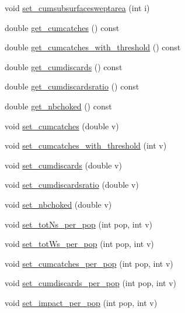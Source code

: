 \begin{DoxyCompactItemize}
void \mbox{\hyperlink{class_node_data_a6e42f6df786bb22c5ecf9ed6409ef620}{set\+\_\+cumsubsurfacesweptarea}} (int i)
\item 
double \mbox{\hyperlink{class_node_data_a72fdd0a26b6b8394848e85a35f3ffd6c}{get\+\_\+cumcatches}} () const
\item 
double \mbox{\hyperlink{class_node_data_af0c4f0aadd5269e87e146096aa319c9d}{get\+\_\+cumcatches\+\_\+with\+\_\+threshold}} () const
\item 
double \mbox{\hyperlink{class_node_data_a9c6feaee560aef467102f8be89b2be9f}{get\+\_\+cumdiscards}} () const
\item 
double \mbox{\hyperlink{class_node_data_ac2ad586d1abdeb855720eef7a53c9d7d}{get\+\_\+cumdiscardsratio}} () const
\item 
double \mbox{\hyperlink{class_node_data_abb730bf1ca3746720aee82026c412188}{get\+\_\+nbchoked}} () const
\item 
void \mbox{\hyperlink{class_node_data_a66410e73ac03ea7d1dacfe0bdc99a219}{set\+\_\+cumcatches}} (double v)
\item 
void \mbox{\hyperlink{class_node_data_a37af34b399035d586105099d768136cf}{set\+\_\+cumcatches\+\_\+with\+\_\+threshold}} (int v)
\item 
void \mbox{\hyperlink{class_node_data_afa19226bbecab1af627ac9a3bd4f030f}{set\+\_\+cumdiscards}} (double v)
\item 
void \mbox{\hyperlink{class_node_data_a7bd35e19d00d6bc27412d62f9d208bd6}{set\+\_\+cumdiscardsratio}} (double v)
\item 
void \mbox{\hyperlink{class_node_data_a6736522e19331356abc9a0d6ed8882fb}{set\+\_\+nbchoked}} (double v)
\item 
void \mbox{\hyperlink{class_node_data_a0848066e27e3cb766039ee852d4c3f18}{set\+\_\+tot\+Ns\+\_\+per\+\_\+pop}} (int pop, int v)
\item 
void \mbox{\hyperlink{class_node_data_aaeb6976e27f095a06820ac6836abf4e3}{set\+\_\+tot\+Ws\+\_\+per\+\_\+pop}} (int pop, int v)
\item 
void \mbox{\hyperlink{class_node_data_a705fd203c73f82893f72474fd991a9c1}{set\+\_\+cumcatches\+\_\+per\+\_\+pop}} (int pop, int v)
\item 
void \mbox{\hyperlink{class_node_data_a3b112825113087ec9652de40df191b84}{set\+\_\+cumdiscards\+\_\+per\+\_\+pop}} (int pop, int v)
\item 
void \mbox{\hyperlink{class_node_data_a148595b384448cdc8a2dff4f8b9b7e9a}{set\+\_\+impact\+\_\+per\+\_\+pop}} (int pop, int v)
\item 

\end{DoxyCompactItemize}
